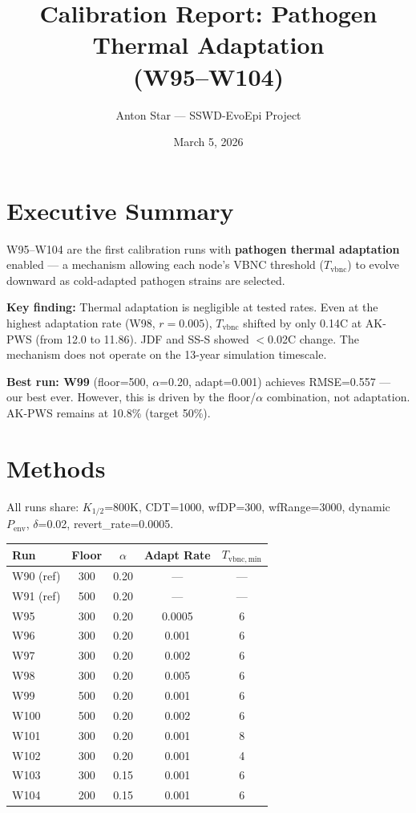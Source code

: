 \documentclass[11pt]{article}
\title{Calibration Report: Pathogen Thermal Adaptation\\(W95--W104)}
\author{Anton Star --- SSWD-EvoEpi Project}
\date{March 5, 2026}
\begin{document}
\maketitle

\section{Executive Summary}
W95--W104 are the first calibration runs with \textbf{pathogen thermal adaptation} enabled --- a mechanism allowing each node's VBNC threshold ($T_\mathrm{vbnc}$) to evolve downward as cold-adapted pathogen strains are selected.

\textbf{Key finding:} Thermal adaptation is negligible at tested rates. Even at the highest adaptation rate (W98, $r=0.005$), $T_\mathrm{vbnc}$ shifted by only 0.14\textdegree C at AK-PWS (from 12.0 to 11.86). JDF and SS-S showed $<$0.02\textdegree C change. The mechanism does not operate on the 13-year simulation timescale.

\textbf{Best run: W99} (floor=500, $\alpha$=0.20, adapt=0.001) achieves RMSE=0.557 --- our best ever. However, this is driven by the floor/$\alpha$ combination, not adaptation. AK-PWS remains at 10.8\% (target 50\%).

\section{Methods}
All runs share: $K_{1/2}$=800K, CDT=1000, wfDP=300, wfRange=3000, dynamic $P_\mathrm{env}$, $\delta$=0.02, revert\_rate=0.0005.

\begin{table}[h]
\centering
\small
\begin{tabular}{lcccc}
\toprule
Run & Floor & $\alpha$ & Adapt Rate & $T_\mathrm{vbnc,min}$ \\
\midrule
W90 (ref) & 300 & 0.20 & --- & --- \\
W91 (ref) & 500 & 0.20 & --- & --- \\
\midrule
W95 & 300 & 0.20 & 0.0005 & 6 \\
W96 & 300 & 0.20 & 0.001 & 6 \\
W97 & 300 & 0.20 & 0.002 & 6 \\
W98 & 300 & 0.20 & 0.005 & 6 \\
W99 & 500 & 0.20 & 0.001 & 6 \\
W100 & 500 & 0.20 & 0.002 & 6 \\
W101 & 300 & 0.20 & 0.001 & 8 \\
W102 & 300 & 0.20 & 0.001 & 4 \\
W103 & 300 & 0.15 & 0.001 & 6 \\
W104 & 200 & 0.15 & 0.001 & 6 \\
\bottomrule
\end{tabular}
\end{table}
\end{document}
